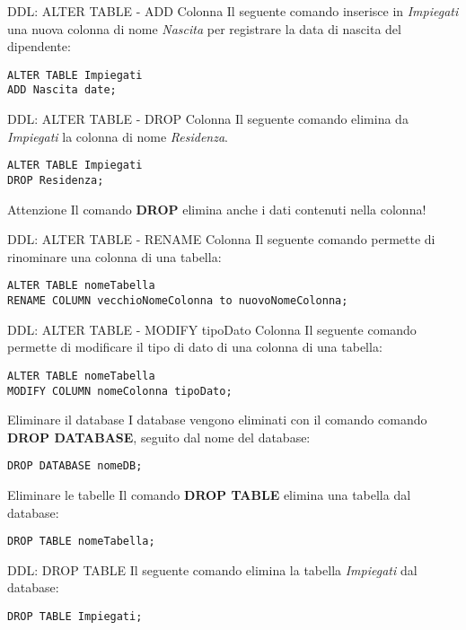 %
\begin{frame}[fragile]{DDL: ALTER TABLE - ADD Colonna}
Il seguente comando inserisce in \textit{Impiegati} una nuova colonna di nome \textit{Nascita} per registrare la data di nascita del dipendente:
\begin{lstlisting}
ALTER TABLE Impiegati
ADD Nascita date;
\end{lstlisting}
\end{frame}
%
\begin{frame}[fragile]{DDL: ALTER TABLE - DROP Colonna}
Il seguente comando elimina da \textit{Impiegati} la colonna di nome \textit{Residenza}.
\begin{lstlisting}
ALTER TABLE Impiegati
DROP Residenza;
\end{lstlisting}
\begin{minipage}{0.7\textwidth}
    \begin{alertblock}{Attenzione}
        Il comando \textbf{DROP} elimina anche i dati contenuti nella colonna!
    \end{alertblock}
\end{minipage}
\end{frame}
%
\begin{frame}[fragile]{DDL: ALTER TABLE - RENAME Colonna}
Il seguente comando permette di rinominare una colonna di una tabella:
\begin{lstlisting}
ALTER TABLE nomeTabella
RENAME COLUMN vecchioNomeColonna to nuovoNomeColonna;
\end{lstlisting}
\end{frame}
%
\begin{frame}[fragile]{DDL: ALTER TABLE - MODIFY tipoDato Colonna}
Il seguente comando permette di modificare il tipo di dato di una colonna di una tabella:
\begin{lstlisting}
ALTER TABLE nomeTabella
MODIFY COLUMN nomeColonna tipoDato;
\end{lstlisting}
\end{frame}
%
\begin{frame}[fragile]{Eliminare il database}
I database vengono eliminati con il comando comando \textbf{DROP DATABASE}, seguito dal nome del database:
\begin{lstlisting}
DROP DATABASE nomeDB;
\end{lstlisting}
\end{frame}
%
\begin{frame}[fragile]{Eliminare le tabelle}
Il comando \textbf{DROP TABLE} elimina una tabella dal database:
\begin{lstlisting}
DROP TABLE nomeTabella;
\end{lstlisting}
\end{frame}
%
\begin{frame}[fragile]{DDL: DROP TABLE}
Il seguente comando elimina la tabella \textit{Impiegati} dal database:
\begin{lstlisting}
DROP TABLE Impiegati;
\end{lstlisting}
\end{frame}
%